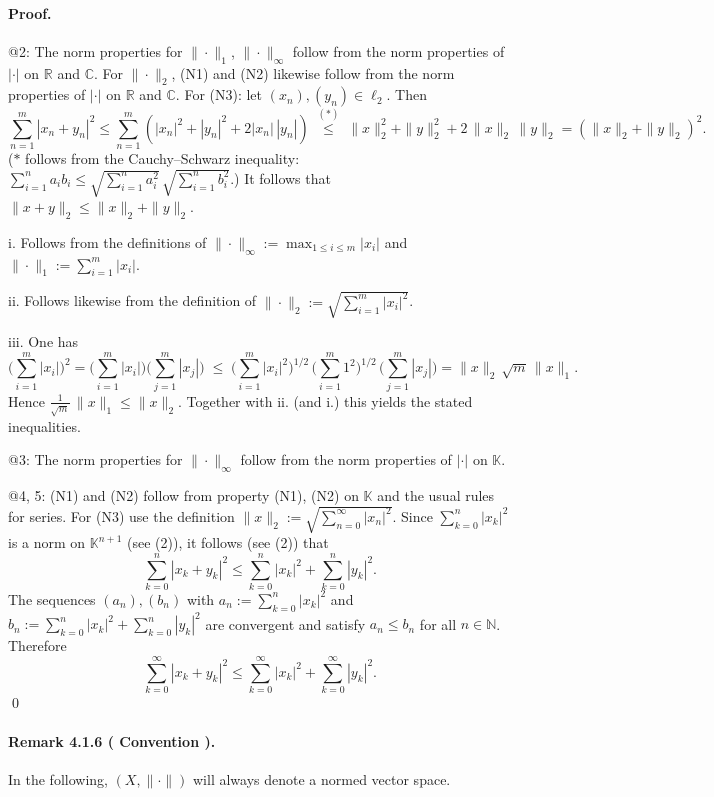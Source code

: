 \documentclass[12pt,a4paper]{article}
\newcommand{\N}{\mathbb{N}}
\newcommand{\R}{\mathbb{R}}
\newcommand{\C}{\mathbb{C}}
\newcommand{\K}{\mathbb{K}} %
\newcommand{\NumberedRemark}[3]{%
\paragraph*{Remark #1 ( #2 ).} #3\par}
\theoremstyle{plain}
\theoremstyle{definition}
\theoremstyle{remark}
\begin{document}
	\paragraph{Proof.}
	@2: The norm properties for $\|\cdot\|_1$, $\|\cdot\|_\infty$ follow from the norm properties of $|\cdot|$ on $\R$ and $\C$. For $\|\cdot\|_2$, (N1) and (N2) likewise follow from the norm properties of $|\cdot|$ on $\R$ and $\C$. For (N3): let $(x_n),(y_n)\in \ell_2$. Then
	\[
		\sum_{n=1}^{m} |x_n+y_n|^2 \le \sum_{n=1}^{m} (|x_n|^2 + |y_n|^2 + 2|x_n|\,|y_n|)
		\;\overset{(*)}{\le}\; \|x\|_2^2 + \|y\|_2^2 + 2\,\|x\|_2\,\|y\|_2 = (\|x\|_2 + \|y\|_2)^2.
	\]
	($*$ follows from the Cauchy--Schwarz inequality: $\sum_{i=1}^{n} a_i b_i \le \sqrt{\sum_{i=1}^{n} a_i^2}\,\sqrt{\sum_{i=1}^{n} b_i^2}$.)
	It follows that $\|x+y\|_2 \le \|x\|_2 + \|y\|_2$.

	\noindent i. Follows from the definitions of $\|\cdot\|_\infty := \max_{1\le i\le m} |x_i|$ and $\|\cdot\|_1 := \sum_{i=1}^{m} |x_i|$.

	\noindent ii. Follows likewise from the definition of $\|\cdot\|_2 := \sqrt{\sum_{i=1}^{m} |x_i|^2}$.

	\noindent iii. One has
	\[
		\Big(\sum_{i=1}^{m} |x_i|\Big)^2 = \Big(\sum_{i=1}^{m} |x_i|\Big)\Big(\sum_{j=1}^{m} |x_j|\Big)
		\;\le\; \Big(\sum_{i=1}^{m} |x_i|^2\Big)^{1/2}\,\Big(\sum_{i=1}^{m} 1^2\Big)^{1/2}\,\Big(\sum_{j=1}^{m} |x_j|\Big)
		= \|x\|_2\,\sqrt{m}\,\|x\|_1.
	\]
	Hence $\tfrac{1}{\sqrt{m}}\,\|x\|_1 \le \|x\|_2$. Together with ii. (and i.) this yields the stated inequalities.

	@3: The norm properties for $\|\cdot\|_\infty$ follow from the norm properties of $|\cdot|$ on $\K$.

	@4, 5: (N1) and (N2) follow from property (N1), (N2) on $\K$ and the usual rules for series. For (N3) use the definition $\|x\|_2 := \sqrt{\sum_{n=0}^{\infty} |x_n|^2}$. Since $\sum_{k=0}^{n} |x_k|^2$ is a norm on $\K^{n+1}$ (see (2)), it follows (see (2)) that
	\[
		\sum_{k=0}^{n} |x_k + y_k|^2 \le \sum_{k=0}^{n} |x_k|^2 + \sum_{k=0}^{n} |y_k|^2.
	\]
	The sequences $ (a_n), (b_n)$ with $a_n := \sum_{k=0}^{n} |x_k|^2$ and $b_n := \sum_{k=0}^{n} |x_k|^2 + \sum_{k=0}^{n} |y_k|^2$ are convergent and satisfy $a_n \le b_n$ for all $n\in\N$. Therefore
	\[
		\sum_{k=0}^{\infty} |x_k + y_k|^2 \le \sum_{k=0}^{\infty} |x_k|^2 + \sum_{k=0}^{\infty} |y_k|^2.
	\]
	\qed

	\NumberedRemark{4.1.6}{Convention}{In the following, $(X,\|\cdot\|)$ will always denote a normed vector space.}
\end{document}
